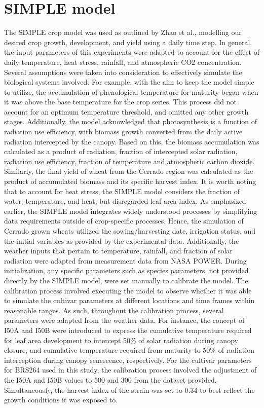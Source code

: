 \documentclass[11pt]{article}
\begin{document}
\section{SIMPLE model}
\label{sec:org3b8960f}
The SIMPLE crop model was used as outlined by Zhao et al., modelling our desired crop growth, development, and yield using a daily time step. In general, the input parameters of this experiments were adapted to account for the effect of daily temperature, heat stress, rainfall, and atmospheric CO2 concentration. Several assumptions were taken into consideration to effectively simulate the biological systems involved. 
For example, with the aim to keep the model simple to utilize, the accumulation of phenological temperature for maturity began when it was above the base temperature for the crop series. This process did not account for an optimum temperature threshold, and omitted any other growth stages. Additionally, the model acknowledged that photosynthesis is a function of radiation use efficiency, with biomass growth converted from the daily active radiation intercepted by the canopy. Based on this, the biomass accumulation was calculated as a product of radiation, fraction of intercepted solar radiation, radiation use efficiency, fraction of temperature and atmospheric carbon dioxide. Similarly, the final yield of wheat from the Cerrado region was calculated as the product of accumulated biomass and its specific harvest index. It is worth noting that to account for heat stress, the SIMPLE model considers the fraction of water, temperature, and heat, but disregarded leaf area index.
As emphasized earlier, the SIMPLE model integrates widely understood processes by simplifying data requirements outside of crop-specific processes. Hence, the simulation of Cerrado grown wheats utilized the sowing/harvesting date, irrigation status, and the initial variables as provided by the experimental data. Additionally, the weather inputs that pertain to temperature, rainfall, and fraction of solar radiation were adapted from measurement data from NASA POWER. During initialization, any specific parameters such as species parameters, not provided directly by the SIMPLE model, were set manually to calibrate the model. 
The calibration process involved executing the model to observe whether it was able to simulate the cultivar parameters at different locations and time frames within reasonable ranges. As such, throughout the calibration process, several parameters were adapted from the weather data. For instance, the concept of I50A and I50B were introduced to express the cumulative temperature required for leaf area development to intercept 50\% of solar radiation during canopy closure, and cumulative temperature required from maturity to 50\% of radiation interception during canopy senescence, respectively. For the cultivar parameters for BRS264 used in this study, the calibration process involved the adjustment of the I50A and I50B values to 500 and 300 from the dataset provided. Simultaneously, the harvest index of the strain was set to 0.34 to best reflect the growth conditions it was exposed to. 
\end{document}
